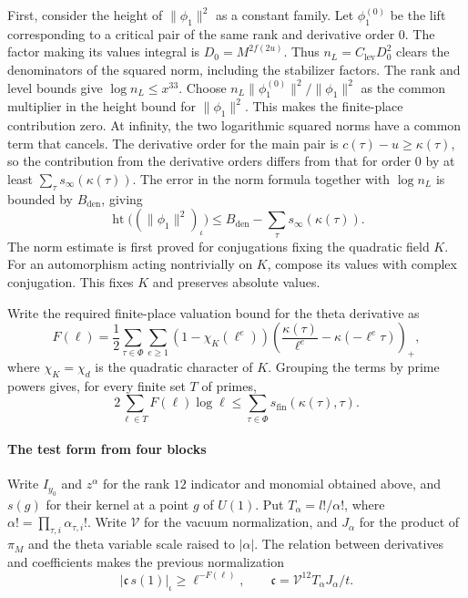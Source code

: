 

First, consider the height of \(\|\phi_1\|^2\) as a constant family.
Let \(\phi^{(0)}_1\) be the lift corresponding to a critical pair of the
same rank and derivative order \(0\). The factor making its values integral is
\(D_0=M^{2f(2u)}\). Thus \(n_L=C_{\mathrm{lev}}D_0^2\) clears the
denominators of the squared norm, including the stabilizer factors.
The rank and level bounds give \(\log n_L\le x^{33}\).
Choose \(n_L\|\phi^{(0)}_1\|^2/\|\phi_1\|^2\) as the common multiplier
in the height bound for \(\|\phi_1\|^2\). This makes the finite-place
contribution zero. At infinity, the two logarithmic squared norms have
a common term that cancels. The derivative order for the main pair is
\(c(\tau)-u\ge\kappa(\tau)\), so the contribution from the derivative
orders differs from that for order \(0\) by at least
\(\sum_\tau s_\infty(\kappa(\tau))\). The error in the norm formula
together with \(\log n_L\) is bounded by \(B_{\mathrm{den}}\), giving
\begin{equation}
 \operatorname{ht}\big((\|\phi_1\|^2)_\iota\big)
  \le B_{\mathrm{den}}-\sum_{\tau} s_\infty(\kappa(\tau)).
 \label{eq:untwisted-rankone-height}
\end{equation}
The norm estimate is first proved for conjugations fixing the quadratic
field \(K\). For an automorphism acting nontrivially on \(K\), compose its
values with complex conjugation. This fixes \(K\) and preserves absolute values.

Write the required finite-place valuation bound for the theta derivative as
\[
 F(\ell)=\frac12\sum_{\tau\in\Phi}\sum_{e\ge 1}
     (1-\chi_K(\ell^e))
     \left(\frac{\kappa(\tau)}{\ell^e}-\kappa(-\ell^e\tau)\right)_+,
\]
where \(\chi_K=\chi_d\) is the quadratic character of \(K\).
Grouping the terms by prime powers gives, for every finite set \(T\)
of primes,
\begin{equation}
 2\sum_{\ell\in T}F(\ell)\log\ell
   \le \sum_{\tau\in\Phi}s_{\mathrm{fin}}(\kappa(\tau),\tau).
 \label{eq:local-prime-total-lower}
\end{equation}





\paragraph{The test form from four blocks}
Write \(I_{y_0}\) and \(z^\alpha\) for the rank \(12\) indicator and monomial
obtained above, and \(s(g)\) for their kernel at a point \(g\) of \(U(1)\).
Put \(T_\alpha=l!/\alpha!\), where \(\alpha!=\prod_{\tau,i}\alpha_{\tau,i}!\).
Write \(\mathcal V\) for the vacuum normalization, and \(J_\alpha\)
for the product of \(\pi_M\) and the theta variable scale raised to
\(|\alpha|\). The relation between derivatives and coefficients makes
the previous normalization
\[
 |\mathfrak c\,s(1)|_\iota\ge\ell^{-F(\ell)},
 \qquad \mathfrak c=\mathcal V^{12}T_\alpha J_\alpha/t .
\]

